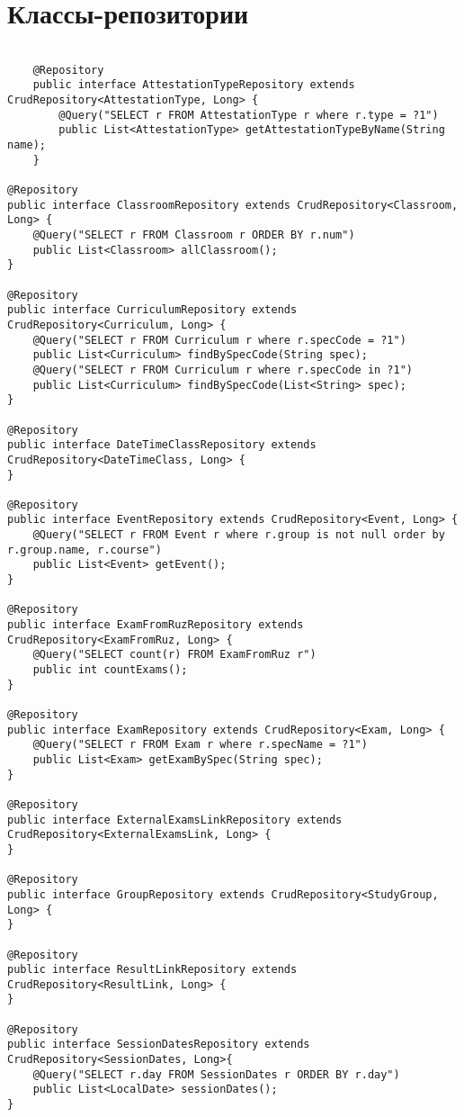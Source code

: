 \chapter{Классы-репозитории}\label{appendix-repo}	

\begin{lstlisting}
	
	@Repository
	public interface AttestationTypeRepository extends CrudRepository<AttestationType, Long> {
		@Query("SELECT r FROM AttestationType r where r.type = ?1")
		public List<AttestationType> getAttestationTypeByName(String name);
	}

@Repository
public interface ClassroomRepository extends CrudRepository<Classroom, Long> {
	@Query("SELECT r FROM Classroom r ORDER BY r.num")
	public List<Classroom> allClassroom();
}

@Repository
public interface CurriculumRepository extends CrudRepository<Curriculum, Long> {
	@Query("SELECT r FROM Curriculum r where r.specCode = ?1")
	public List<Curriculum> findBySpecCode(String spec);
	@Query("SELECT r FROM Curriculum r where r.specCode in ?1")
	public List<Curriculum> findBySpecCode(List<String> spec);
}

@Repository
public interface DateTimeClassRepository extends CrudRepository<DateTimeClass, Long> {
}

@Repository
public interface EventRepository extends CrudRepository<Event, Long> {
	@Query("SELECT r FROM Event r where r.group is not null order by r.group.name, r.course")
	public List<Event> getEvent();
}

@Repository
public interface ExamFromRuzRepository extends CrudRepository<ExamFromRuz, Long> {
	@Query("SELECT count(r) FROM ExamFromRuz r")
	public int countExams();
}

@Repository
public interface ExamRepository extends CrudRepository<Exam, Long> {
	@Query("SELECT r FROM Exam r where r.specName = ?1")
	public List<Exam> getExamBySpec(String spec);
}

@Repository
public interface ExternalExamsLinkRepository extends CrudRepository<ExternalExamsLink, Long> {
}

@Repository
public interface GroupRepository extends CrudRepository<StudyGroup, Long> {
}

@Repository
public interface ResultLinkRepository extends CrudRepository<ResultLink, Long> {
}

@Repository
public interface SessionDatesRepository extends CrudRepository<SessionDates, Long>{
	@Query("SELECT r.day FROM SessionDates r ORDER BY r.day")
	public List<LocalDate> sessionDates();
}


\end{lstlisting}
